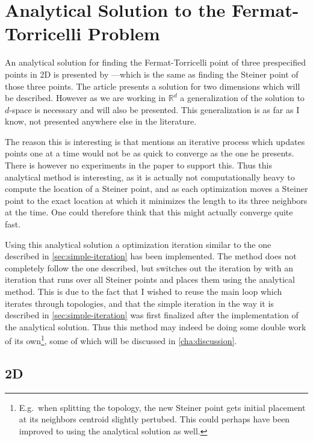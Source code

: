 \section{Analytical Solution to the Fermat-Torricelli Problem}
\label{sec:analyt-solut-ferm}

An analytical solution for finding the Fermat-Torricelli point of three
prespecified points in 2D is presented by \textcite{uteshev2014}---which is the same as
finding the Steiner point of those three points. The article presents a
solution for two dimensions which will be described. However as we are working
in $\mathbb{R}^d$ a generalization of the solution to $d$-space is necessary and
will also be presented. This generalization is as far as I know, not presented
anywhere else in the literature.

The reason this is interesting is that \textcite{smith1992} mentions an
iterative process which updates points one at a time would not be as quick to
converge as the one he presents. There is however no experiments in the paper to
support this. Thus this analytical method is interesting, as it is actually not
computationally heavy to compute the location of a Steiner point, and as each
optimization moves a Steiner point to the exact location at which it minimizes
the length to its three neighbors at the time. One could therefore think that this might
actually converge quite fast.

Using this analytical solution a optimization iteration similar to the one
described in \cref{sec:simple-iteration} has been implemented. The method does
not completely follow the one described, but switches out the iteration by
\citeauthor{smith1992} with an iteration that runs over all Steiner points and
places them using the analytical method. This is due to the fact that I wished
to reuse the main loop which iterates through topologies, and that the simple
iteration in the way it is described in \cref{sec:simple-iteration} was first
finalized after the implementation of the analytical solution. Thus this method
may indeed be doing some double work of its own\footnote{E.g.\ when splitting
  the topology, the new Steiner point gets initial placement at its neighbors
  centroid slightly pertubed. This could perhaps have been improved to using the
  analytical solution as well.}, some of which will be discussed in
\cref{cha:discussion}.

\subsection{2D}
\label{sec:2d}

